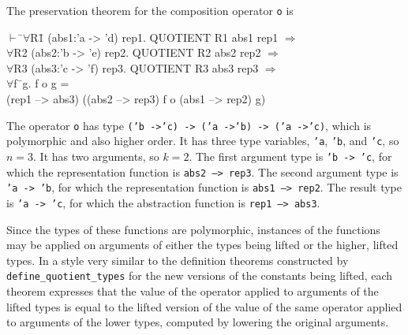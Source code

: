 \documentclass[envcountsame,runningheads]{llncs}
\begin{document}
\pagebreak[3]
The preservation theorem for the composition operator {\tt o} is
{\tt \begin{tabbing}
\hspace{5.5mm}
    $\vdash$ \=$\forall$R\=1 (abs1:'a -> 'd) rep1. QUOTIENT R1 abs1 rep1 $\Rightarrow$ \\
\>     $\forall$R2 (abs2:'b -> 'e) rep2. QUOTIENT R2 abs2 rep2 $\Rightarrow$ \\
\>     $\forall$R3 (abs3:'c -> 'f) rep3. QUOTIENT R3 abs3 rep3 $\Rightarrow$ \\
\>\>     $\forall$f\=\ g. f o g = \\
\>\>\>     (rep1 --> abs3) ((abs2 --> rep3) f o (abs1 --> rep2) g)
\end{tabbing}}
The operator {\tt o} has type
{\tt ('b ->\;'c) -> ('a ->\;'b) -> ('a ->\;'c)},
which is polymorphic and also higher order.
It has three type variables, {\tt 'a}, {\tt 'b}, and {\tt 'c}, so $n = 3$. 
It has two arguments, so $k = 2$.
The first argument type is
{\tt 'b -> 'c},
for which
the representation function
is {\tt abs2 --> rep3}.
The second argument type is
{\tt 'a -> 'b},
for which
the representation function
is {\tt abs1 --> rep2}.
The result type is
{\tt 'a -> 'c},
for which
the abstraction function
is {\tt rep1 --> abs3}.



Since the types of
these functions are polymorphic, instances of the functions may be applied 
on arguments of either the types being lifted or the higher, lifted types.
In a style very similar to the definition theorems constructed
by {\tt define\_quotient\_types} for the new versions of the 
constants being lifted, 
each theorem expresses that the value of
the operator applied to arguments of the lifted types
is equal to the lifted version of the value of the same operator
applied to arguments of the lower types,
computed by lowering the original arguments. 
\end{document}
